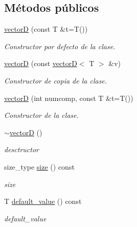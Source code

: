 \subsection*{Métodos públicos}
\begin{DoxyCompactItemize}
\item 
\mbox{\label{classvectorD_a202fcec0f27b4bb4db0811516b39c281}} 
\hyperlink{classvectorD_a202fcec0f27b4bb4db0811516b39c281}{vectorD} (const T \&t=T())
\begin{DoxyCompactList}\small\item\em Constructor por defecto de la clase. \end{DoxyCompactList}\item 
\hyperlink{classvectorD_ae2ae2997890f32424eb64a23c1924cf8}{vectorD} (const \hyperlink{classvectorD}{vectorD}$<$ T $>$ \&v)
\begin{DoxyCompactList}\small\item\em Constructor de copia de la clase. \end{DoxyCompactList}\item 
\hyperlink{classvectorD_ab982195db0c1f79621164da68b3eae16}{vectorD} (int numcomp, const T \&t=T())
\begin{DoxyCompactList}\small\item\em Constructor de la clase. \end{DoxyCompactList}\item 
\mbox{\label{classvectorD_a1cf0348f69cfbebaada17043b0c4cfbc}} 
\hyperlink{classvectorD_a1cf0348f69cfbebaada17043b0c4cfbc}{$\sim$vectorD} ()
\begin{DoxyCompactList}\small\item\em desctructor \end{DoxyCompactList}\item 
size\+\_\+type \hyperlink{classvectorD_a224cbb0559f23d4eff2010b3406177f6}{size} () const
\begin{DoxyCompactList}\small\item\em size \end{DoxyCompactList}\item 
T \hyperlink{classvectorD_ad1f0d076a2514fce062bbe0189fbcef1}{default\+\_\+value} () const
\begin{DoxyCompactList}\small\item\em default\+\_\+value \end{DoxyCompactList}\item 

\end{DoxyCompactItemize}

